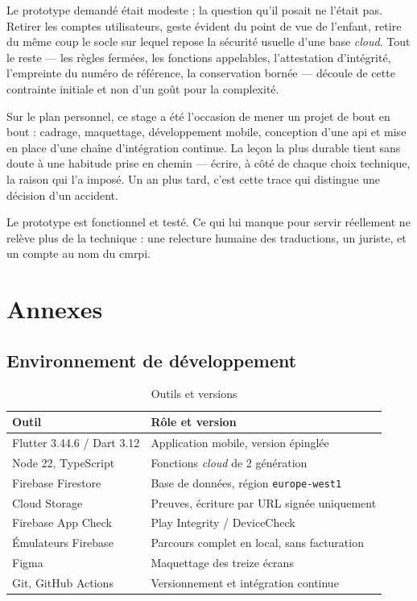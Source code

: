 \documentclass[11pt,a4paper,oneside,openany]{report}
\begin{document}
Le prototype demandé était modeste ; la question qu'il posait ne l'était pas.
Retirer les comptes utilisateurs, geste évident du point de vue de l'enfant,
retire du même coup le socle sur lequel repose la sécurité usuelle d'une base
\emph{cloud}. Tout le reste — les règles fermées, les fonctions appelables,
l'attestation d'intégrité, l'empreinte du numéro de référence, la conservation
bornée — découle de cette contrainte initiale et non d'un goût pour la
complexité.

Sur le plan personnel, ce stage a été l'occasion de mener un projet de bout en
bout : cadrage, maquettage, développement mobile, conception d'une \gls{api} et
mise en place d'une chaîne d'intégration continue. La leçon la plus durable tient
sans doute à une habitude prise en chemin — écrire, à côté de chaque choix
technique, la raison qui l'a imposé. Un an plus tard, c'est cette trace qui
distingue une décision d'un accident.

Le prototype est fonctionnel et testé. Ce qui lui manque pour servir réellement
ne relève plus de la technique : une relecture humaine des traductions, un
juriste, et un compte au nom du \gls{cmrpi}.

\cleardoublepage
\printbibliography[heading=bibintoc,title={Bibliographie et références}]

\appendix
\renewcommand{\chaptertitlename}{Annexe}

\chapter{Annexes}
\section{Environnement de développement}
\label{ann:env}

\begin{table}[htbp]
\centering
\small
\caption{Outils et versions}
\label{tab:outils}
\begin{tabularx}{\textwidth}{@{}L{4.2cm} X@{}}
\toprule
\textbf{Outil} & \textbf{Rôle et version} \\
\midrule
Flutter 3.44.6 / Dart 3.12 & Application mobile, version épinglée \\
Node 22, TypeScript & Fonctions \emph{cloud} de 2\ieme{} génération \\
Firebase Firestore & Base de données, région \texttt{europe-west1} \\
Cloud Storage & Preuves, écriture par URL signée uniquement \\
Firebase App Check & Play Integrity / DeviceCheck \\
Émulateurs Firebase & Parcours complet en local, sans facturation \\
Figma & Maquettage des treize écrans \\
Git, GitHub Actions & Versionnement et intégration continue \\
\bottomrule
\end{tabularx}
\end{table}
\end{document}
